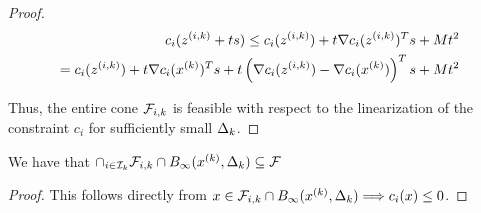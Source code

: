 \begin{proof}
\begin{align*}
c_i({z^{(i, k)}} + ts) \le c_i({z^{(i, k)}}) + t\nabla c_i({z^{(i, k)}})^Ts + Mt^2 \\
= c_i({z^{(i, k)}}) + t\nabla c_i({x^{(k)}})^Ts + t\left (\nabla c_i({z^{(i, k)}}) - \nabla c_i({x^{(k)}})\right)^Ts + Mt^2 \\
\end{align*}

Thus, the entire cone ${\mathcal F_{i, k}}$ is feasible with respect to the linearization of the constraint $c_i$ for sufficiently small $\Delta_k$.

\end{proof}



\begin{theorem}
We have that $\cap_{i \in {\mathcal I_{k}}} {\mathcal F_{i, k}} \cap B_{\infty}({x^{(k)}}, \Delta_k) \subseteq {\mathcal F}$ 
\end{theorem}

\begin{proof}
This follows directly from $x \in {\mathcal F_{i, k}} \cap B_{\infty}({x^{(k)}}, \Delta_k) \Longrightarrow c_i(x) \le 0$.
\end{proof}



